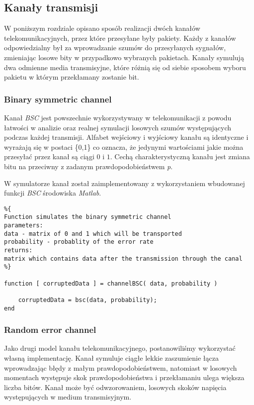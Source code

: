 \documentclass{article}
\begin{document}
\subsection{Kanały transmisji}

W poniższym rozdziale opisano sposób realizacji dwóch kanałów telekomunikacyjnych, przez które przesyłane były pakiety. Każdy z kanałów odpowiedzialny był za wprowadzanie szumów do przesyłanych sygnałów, zmieniając losowe bity w przypadkowo wybranych pakietach. Kanały symulują dwa odmienne media transmisyjne, które różnią się od siebie sposobem wyboru pakietu w którym przekłamany zostanie bit.

\subsubsection{Binary symmetric channel}

Kanał \textit{BSC} jest powszechnie wykorzystywany w telekomunikacji z powodu łatwości w analizie oraz realnej symulacji losowych szumów występujących podczas każdej transmisji. Alfabet wejściowy i wyjściowy kanału są identyczne i wyrażają się w postaci \{0,1\} co oznacza, że jedynymi wartościami jakie można przesyłać przez kanał są ciągi $0$ i $1$. Cechą charakterystyczną kanału jest zmiana bitu na przeciwny z zadanym prawdopodobieństwem \textit{p}.

W symulatorze kanał został zaimplementowany z wykorzystaniem wbudowanej funkcji \textit{BSC} środowiska \textit{Matlab}.

\begin{verbatim}
%{
Function simulates the binary symmetric channel
parameters:
data - matrix of 0 and 1 which will be transported
probability - probablity of the error rate
returns:
matrix which contains data after the transmission through the canal
%}

function [ corruptedData ] = channelBSC( data, probability )

    corruptedData = bsc(data, probability);
end
\end{verbatim}

\subsubsection{Random error channel}

Jako drugi model kanału telekomunikacyjnego, postanowiliśmy wykorzystać własną implementację. Kanał symuluje ciągłe lekkie zaszumienie łącza wprowadzając błędy z małym prawdopodobieństwem, natomiast w losowych momentach występuje skok prawdopodobieństwa i przekłamaniu ulega większa liczba bitów. Kanał może być odwzorowaniem, losowych skoków napięcia występujących w medium transmisyjnym.
\end{document}
